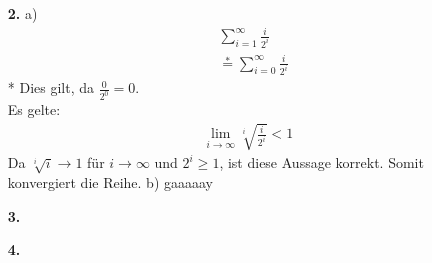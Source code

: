 \documentclass[a4paper,11pt]{article}
\begin{document}
\begin{enumerate}
        \item[\textbf{2.}]
            \subitem a)
                \begin{align*}
                    &\sum_{i=1}^\infty \frac{i}{2^i}\\
                    &\overset{*}{=} \sum_{i=0}^\infty \frac{i}{2^i}
                \end{align*}
                * Dies gilt, da $\frac{0}{2^0} = 0$.\\
                Es gelte:
                \begin{align*}
                    \underset{i \to \infty}{\lim} \sqrt[i]{\frac{i}{2^i}} < 1
                \end{align*}
                Da $\sqrt[i]{i} \to 1$ für $i \to \infty$ und $2^i \geq 1$, ist diese Aussage korrekt. Somit konvergiert die Reihe.
            \subitem b)
                gaaaaay
        \item[\textbf{3.}]
	\todo

        \item[\textbf{4.}]
	\todo

    \end{enumerate}
\end{document}
